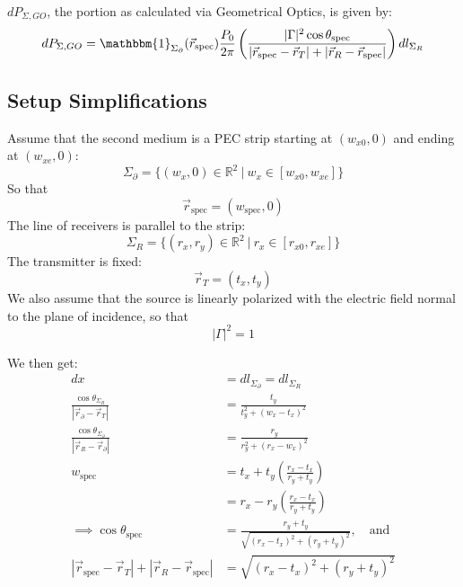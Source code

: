 \documentclass{article}
\begin{document}
$dP_{\Sigma, GO}$, the portion as calculated via Geometrical Optics, is given by:
\begin{equation}
   dP_{\Sigma, GO} = \mathbbm{1}_{\Sigma_\partial} (\vec{r}_{\text{spec}})
      \frac{P_0}{2 \pi} \left( \frac{|\Gamma|^2 \cos \theta_{\text{spec}}}{
      |\vec{r}_{\text{spec}} - \vec{r}_T| + |\vec{r}_R - \vec{r}_{\text{spec}}| }
      \right) dl_{\Sigma_R}
   \label{eq:GOPowerCalc}
\end{equation}

\subsection{Setup Simplifications}
Assume that the second medium is a PEC strip starting at $(w_{x0}, 0)$ and ending at
$(w_{xe}, 0)$:
\begin{equation}
   \Sigma_{\partial} = \{ (w_x, 0) \in \mathbb{R}^2 \ | \ w_x \in [ w_{x0}, w_{xe} ] \}
   \label{eq:boundaryPosition}
\end{equation}
So that
\begin{equation}
   \vec{r}_{\text{spec}} = ( w_{\text{spec}}, 0 )
   \label{eq:specPointFlatWall}
\end{equation}
The line of receivers is parallel to the strip:
\begin{equation}
   \Sigma_{R} = \{ (r_x, r_y) \in \mathbb{R}^2 \ | \ r_x \in [ r_{x0}, r_{xe} ] \}
   \label{eq:receiverPositions}
\end{equation}
The transmitter is fixed:
\begin{equation}
   \vec{r}_T = (t_x, t_y)
   \label{eq:transmitterPosition}
\end{equation}
We also assume that the source is linearly polarized with the electric field normal
to the plane of incidence, so that 
\begin{equation}
   |\Gamma|^2 = 1
   \label{eq:polarizationSimplification}
\end{equation}

We then get:
\begin{align*}
   dx &= dl_{\Sigma_{\partial}} = dl_{\Sigma_R} \\
   \frac{\cos \theta_{\Sigma_R}}{| \vec{r}_{\partial} - \vec{r}_T |} &= \frac{t_y}{t^2_y + (w_x - t_x)^2} \\
   \frac{\cos \theta_{\Sigma_{\partial}}}{| \vec{r}_{R} - \vec{r}_{\partial} |} &= \frac{r_y}{r^2_y + (r_x - w_x)^2} \\
   w_{\text{spec}} &= t_x + t_y \left( \frac{r_x - t_x}{r_y + t_y} \right) \\
   &= r_x - r_y \left( \frac{r_x - t_x}{r_y + t_y} \right) \\
   \implies \cos \theta_{\text{spec}} &= \frac{r_y + t_y}{\sqrt{(r_x - t_x)^2 +
      (r_y+t_y)^2}}, \quad \text{and} \\
   |\vec{r}_{\text{spec}} - \vec{r}_T| + |\vec{r}_R - \vec{r}_{\text{spec}}| &=
      \sqrt{(r_x - t_x)^2 + (r_y + t_y)^2}
\end{align*}
\end{document}

